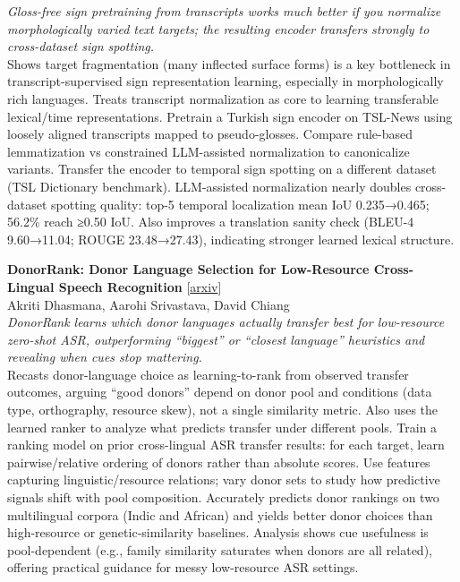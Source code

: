 \documentclass[12pt,letterpaper]{article}
\begin{document}
{\small\textit{Gloss-free sign pretraining from transcripts works much better if you normalize morphologically varied text targets; the resulting encoder transfers strongly to cross-dataset sign spotting.}}\\[1pt]
{\footnotesize Shows target fragmentation (many inflected surface forms) is a key bottleneck in transcript-supervised sign representation learning, especially in morphologically rich languages. Treats transcript normalization as core to learning transferable lexical/time representations. Pretrain a Turkish sign encoder on TSL-News using loosely aligned transcripts mapped to pseudo-glosses. Compare rule-based lemmatization vs constrained LLM-assisted normalization to canonicalize variants. Transfer the encoder to temporal sign spotting on a different dataset (TSL Dictionary benchmark). LLM-assisted normalization nearly doubles cross-dataset spotting quality: top-5 temporal localization mean IoU 0.235→0.465; 56.2\% reach ≥0.50 IoU. Also improves a translation sanity check (BLEU-4 9.60→11.04; ROUGE 23.48→27.43), indicating stronger learned lexical structure.}

\medskip

{\small\textbf{DonorRank: Donor Language Selection for Low-Resource Cross-Lingual Speech Recognition}} {\scriptsize[\href{https://arxiv.org/abs/2608.11441}{arxiv}]}\\
{\scriptsize Akriti Dhasmana, Aarohi Srivastava, David Chiang}\\

{\small\textit{DonorRank learns which donor languages actually transfer best for low-resource zero-shot ASR, outperforming ``biggest'' or ``closest language'' heuristics and revealing when cues stop mattering.}}\\[1pt]
{\footnotesize Recasts donor-language choice as learning-to-rank from observed transfer outcomes, arguing ``good donors'' depend on donor pool and conditions (data type, orthography, resource skew), not a single similarity metric. Also uses the learned ranker to analyze what predicts transfer under different pools. Train a ranking model on prior cross-lingual ASR transfer results: for each target, learn pairwise/relative ordering of donors rather than absolute scores. Use features capturing linguistic/resource relations; vary donor sets to study how predictive signals shift with pool composition. Accurately predicts donor rankings on two multilingual corpora (Indic and African) and yields better donor choices than high-resource or genetic-similarity baselines. Analysis shows cue usefulness is pool-dependent (e.g., family similarity saturates when donors are all related), offering practical guidance for messy low-resource ASR settings.}
\end{document}
